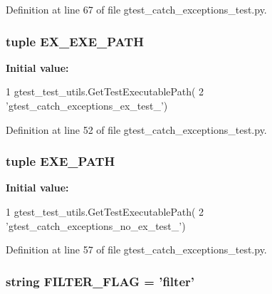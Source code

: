 \-Definition at line 67 of file gtest\-\_\-catch\-\_\-exceptions\-\_\-test.\-py.

\hypertarget{namespacegtest__catch__exceptions__test_ae7e7ed3d46ad6c855a70460742235eaf}{
\subsubsection[{\-E\-X\-\_\-\-E\-X\-E\-\_\-\-P\-A\-T\-H}]{\setlength{\rightskip}{0pt plus 5cm}tuple {\bf \-E\-X\-\_\-\-E\-X\-E\-\_\-\-P\-A\-T\-H}}}\label{dd/dbf/namespacegtest__catch__exceptions__test_ae7e7ed3d46ad6c855a70460742235eaf}
{\bfseries \-Initial value\-:}
\begin{DoxyCode}
1 gtest_test_utils.GetTestExecutablePath(
2     'gtest_catch_exceptions_ex_test_')
\end{DoxyCode}


\-Definition at line 52 of file gtest\-\_\-catch\-\_\-exceptions\-\_\-test.\-py.

\hypertarget{namespacegtest__catch__exceptions__test_a216df3f485400b109390103528720888}{
\subsubsection[{\-E\-X\-E\-\_\-\-P\-A\-T\-H}]{\setlength{\rightskip}{0pt plus 5cm}tuple {\bf \-E\-X\-E\-\_\-\-P\-A\-T\-H}}}\label{dd/dbf/namespacegtest__catch__exceptions__test_a216df3f485400b109390103528720888}
{\bfseries \-Initial value\-:}
\begin{DoxyCode}
1 gtest_test_utils.GetTestExecutablePath(
2     'gtest_catch_exceptions_no_ex_test_')
\end{DoxyCode}


\-Definition at line 57 of file gtest\-\_\-catch\-\_\-exceptions\-\_\-test.\-py.

\hypertarget{namespacegtest__catch__exceptions__test_a4e1a92405aa6d661157f2f8498692796}{
\subsubsection[{\-F\-I\-L\-T\-E\-R\-\_\-\-F\-L\-A\-G}]{\setlength{\rightskip}{0pt plus 5cm}string {\bf \-F\-I\-L\-T\-E\-R\-\_\-\-F\-L\-A\-G} = 'filter'}}\label{dd/dbf/namespacegtest__catch__exceptions__test_a4e1a92405aa6d661157f2f8498692796}


